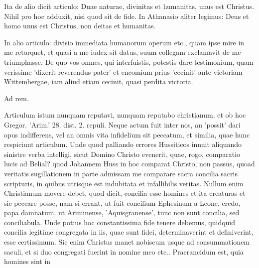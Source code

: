 Ita de alio dicit articulo: Duae naturae, divinitas et humanitas, unus est Christus. Nihil pro hoc adduxit, nisi quod sit de fide. In Athanasio aliter legimus: Deus et homo unus est Christus, non deitas et humanitas.

In alio articulo: divisio immediata humanorum operum etc., quam ipse mire in me retorquet, et quasi a me iudex sit datus, suum collegam exclamavit de me triumphasse. De quo vos omnes, qui interfuistis, potestis dare testimonium, quam verissime 'dixerit reverendus pater' et encomium prius 'cecinit' ante victoriam Wittembergae, iam aliud etiam cecinit, quasi perdita victoria.

Ad rem.

Articulum istum nunquam reputavi, nunquam reputabo christianum, et ob hoc Gregor. 'Arim.' 28. dist. 2. repuli. Neque actum fuit inter nos, an 'possit' dari opus indifferens, vel an omnis vita infidelium sit peccatum, et similia, quae hunc respiciunt articulum. Unde quod palliando errores Hussiticos innuit aliquando sinistre verba intelligi, sicut Domino Christo evenerit, quae, rogo, comparatio lucis ad Belial? quod Johannem Huss in hoc comparat Christo, non passus, quoad veritatis sugillationem in parte admissam me comparare sacra \marginpar{\small[296]} concilia sacris scripturis, in quibus utrisque est indubitata et infallibilis veritas. Nullum enim Christianum movere debet, quod dicit, concilia esse homines et ita creaturas et sic peccare posse, nam si errant, ut fuit concilium Ephesinum a Leone, credo, papa damnatum, ut Ariminense, 'Aquisgranense', tunc non sunt concilia, sed conciliabula. Unde potius hoc constantissima fide tenere debemus, quidquid concilia legitime congregata in iis, quae sunt fidei, determinaverint et definiverint, esse certissimum. Sic enim Christus manet nobiscum usque ad consummationem saculi, et si duo congregati fuerint in nomine meo etc.. Praerancidum est, quia homines sint in

